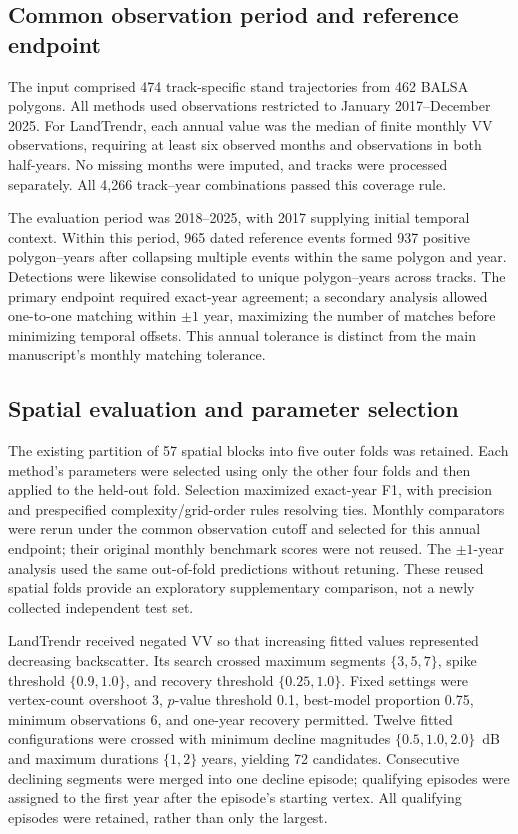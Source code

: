 \documentclass[11pt,a4paper]{article}
\begin{document}
\subsection{Common observation period and reference endpoint}
The input comprised 474 track-specific stand trajectories from 462 BALSA polygons. All methods used observations restricted to January 2017--December 2025. For LandTrendr, each annual value was the median of finite monthly VV observations, requiring at least six observed months and observations in both half-years. No missing months were imputed, and tracks were processed separately. All 4,266 track--year combinations passed this coverage rule.

The evaluation period was 2018--2025, with 2017 supplying initial temporal context. Within this period, 965 dated reference events formed 937 positive polygon--years after collapsing multiple events within the same polygon and year. Detections were likewise consolidated to unique polygon--years across tracks. The primary endpoint required exact-year agreement; a secondary analysis allowed one-to-one matching within $\pm1$ year, maximizing the number of matches before minimizing temporal offsets. This annual tolerance is distinct from the main manuscript's monthly matching tolerance.

\subsection{Spatial evaluation and parameter selection}
The existing partition of 57 spatial blocks into five outer folds was retained. Each method's parameters were selected using only the other four folds and then applied to the held-out fold. Selection maximized exact-year F1, with precision and prespecified complexity/grid-order rules resolving ties. Monthly comparators were rerun under the common observation cutoff and selected for this annual endpoint; their original monthly benchmark scores were not reused. The $\pm1$-year analysis used the same out-of-fold predictions without retuning. These reused spatial folds provide an exploratory supplementary comparison, not a newly collected independent test set.

LandTrendr received negated VV so that increasing fitted values represented decreasing backscatter. Its search crossed maximum segments $\{3,5,7\}$, spike threshold $\{0.9,1.0\}$, and recovery threshold $\{0.25,1.0\}$. Fixed settings were vertex-count overshoot 3, $p$-value threshold 0.1, best-model proportion 0.75, minimum observations 6, and one-year recovery permitted. Twelve fitted configurations were crossed with minimum decline magnitudes $\{0.5,1.0,2.0\}$~dB and maximum durations $\{1,2\}$ years, yielding 72 candidates. Consecutive declining segments were merged into one decline episode; qualifying episodes were assigned to the first year after the episode's starting vertex. All qualifying episodes were retained, rather than only the largest.
\end{document}

